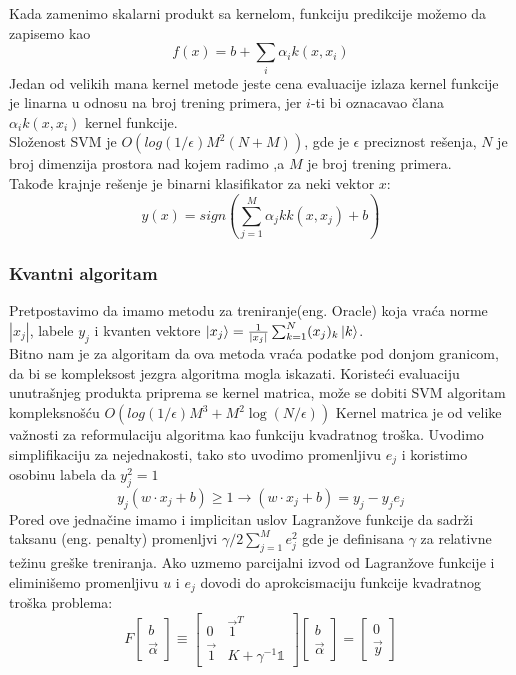 \documentclass[12pt, letterpaper, oneside]{article}
\begin{document}
Kada zamenimo skalarni produkt sa kernelom, funkciju predikcije možemo da zapisemo kao
\[
    f(x) = b + \sum_i \alpha_{i}k(x,x_i)
\]
Jedan od velikih mana kernel metode jeste cena evaluacije izlaza kernel funkcije je linarna u odnosu na broj trening primera, jer $i$-ti bi oznacavao člana $\alpha_ik(x,x_i)$ kernel funkcije. \cite{goodfellow2016deep} \\
Složenost SVM je $O(log(1/\epsilon)M^2(N+M))$, gde je $\epsilon$ preciznost rešenja, $N$ je broj dimenzija prostora nad kojem radimo ,a $M$ je broj trening primera. \\
Takođe krajnje rešenje je binarni klasifikator za neki vektor $x$:
\[
    y(x) = sign(\sum_{j=1}^{M}\alpha_jkk(x,x_j) + b)
\]

\subsubsection{Kvantni algoritam}
Pretpostavimo da imamo metodu za treniranje(eng. Oracle) koja vraća norme $|x_j|$, labele $y_j$ i kvanten vektore $\Ket{x_j} = \frac{1}{|x_j|}\sum_{k=1}^{N}(x_j)_k\Ket{k}$. \\
Bitno nam je za algoritam da ova metoda vraća podatke pod donjom granicom, da bi se kompleksost jezgra algoritma mogla iskazati.
Koristeći evaluaciju unutrašnjeg produkta priprema se kernel matrica, može se dobiti SVM algoritam kompleksnošću $O(log(1/\epsilon)M^3 + M^{2}\log(N/\epsilon))$
Kernel matrica je od velike važnosti za reformulaciju algoritma kao funkciju kvadratnog troška. 
Uvodimo simplifikaciju za nejednakosti, tako sto uvodimo promenljivu $e_j$ i koristimo osobinu labela da $y_j^2=1$
\[
    y_{j}(w \cdot x_j + b) \geq 1 \to (w \cdot x_j + b) = y_{j} - y_{j}e_{j}
\]
Pored ove jednačine imamo i implicitan uslov Lagranžove funkcije da sadrži taksanu (eng. penalty) promenljvi
$\gamma/2\sum_{j=1}^{M}e_j^2$ gde je definisana $\gamma$ za relativne težinu greške treniranja.
Ako uzmemo parcijalni izvod od Lagranžove funkcije i eliminišemo promenljivu $u$ i $e_j$ dovodi do aprokcismaciju funkcije kvadratnog troška problema:
\[
    F\begin{bmatrix}
        b \\
        \overrightarrow{\alpha}
    \end{bmatrix}
    \equiv \begin{bmatrix}
        0 & \overrightarrow{1}^T \\
        \overrightarrow{1} & K+\gamma^{-1} \mathbb{1}
    \end{bmatrix}
    \begin{bmatrix}
        b \\
        \overrightarrow{\alpha}
    \end{bmatrix} =
    \begin{bmatrix}
        0 \\
        \overrightarrow{y}
    \end{bmatrix}
\]
\end{document}
